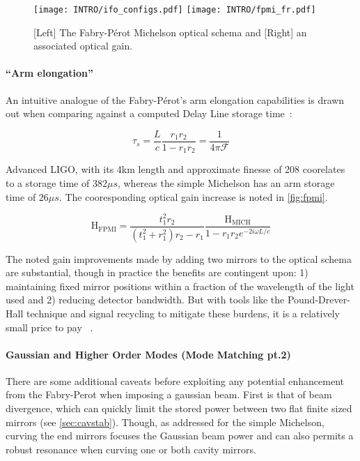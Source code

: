 \begin{figure}[ht!]
  \begin{subcaptiongroup}{\texttt{[image: INTRO/ifo\_configs.pdf]}}
  \texttt{[image: INTRO/fpmi\_fr.pdf]}
  \end{subcaptiongroup}
  \hfill
  \caption{[Left] The Fabry-P\'{e}rot Michelson optical schema and [Right] an associated optical gain.}
  \label{fig:fpmi}
\end{figure}

\paragraph{``Arm elongation''}

An intuitive analogue of the Fabry-P\'{e}rot's arm elongation capabilities is drawn out when comparing against a computed Delay Line storage time~\cite{saulson:2017}:

\begin{equation}
	\tau_s = \frac{L}{c} \frac{r_1r_2}{1-r_1r_2} = \frac{1}{4 \pi \mathscr{F}}
\end{equation}

Advanced LIGO, with its 4km length and approximate finesse of 208 coorelates to a storage time of $382\mu s$, whereas the simple Michelson has an arm storage time of $26 \mu s$. The cooresponding optical gain increase is noted in \autoref{fig:fpmi}. 

\begin{equation}
	\mathrm{H_{FPMI}} = \frac{t_1 ^2 r_2}{(t_1^2 + r_1^2)r_2 - r_1} \frac{\mathrm{H_{MICH}}}{1 - r_1 r_2 e^{-2i \omega L / c}}
\end{equation}

The noted gain improvements made by adding two mirrors to the optical schema are substantial, though in practice the benefits are contingent upon: 1) maintaining fixed mirror positions within a fraction of the wavelength of the light used and 2) reducing detector bandwidth. But with tools like the Pound-Drever-Hall technique and signal recycling to mitigate these burdens, it is a relatively small price to pay ~\cite{black:pdh}.

\paragraph{Gaussian and Higher Order Modes (Mode Matching pt.2)}\label{subsubsubsubsec:mm2}

There are some additional caveats before exploiting any potential enhancement from the Fabry-Perot when imposing a gaussian beam. First is that of beam divergence, which can quickly limit the stored power between two flat finite sized mirrors (see \autoref{sec:cavstab}). Though, as addressed for the simple Michelson, curving the end mirrors focuses the Gaussian beam power and can also permits a robust resonance when curving one or both cavity mirrors. 


